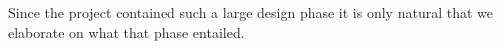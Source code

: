Since the project contained such a large design phase it is only natural that we elaborate on what that phase entailed.


